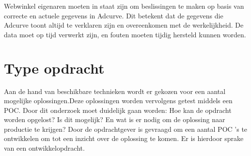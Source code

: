 Webwinkel eigenaren moeten in staat zijn om beslissingen te maken op basis van correcte en actuele gegevens in Adcurve. Dit betekent dat de gegevens die Adcurve toont altijd te verklaren zijn en overeenkomen met de werkelijkheid. De data moet op tijd verwerkt zijn, en fouten moeten tijdig hersteld kunnen worden.

\section{Type opdracht}

Aan de hand van beschikbare technieken wordt er gekozen voor een aantal mogelijke oplossingen.\newline Deze oplossingen worden vervolgens getest middels een POC. Door dit onderzoek moet duidelijk gaan worden: Hoe kan de opdracht worden opgelost? Is dit mogelijk? En wat is er nodig om de oplossing naar productie te krijgen? Door de opdrachtgever is gevraagd om een aantal POC 's te ontwikkelen om tot een inzicht over de oplossing te komen. Er is hierdoor sprake van een ontwikkelopdracht.
